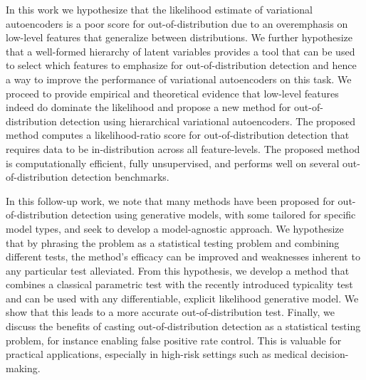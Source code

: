 In this work we hypothesize that the likelihood estimate of variational autoencoders is a poor score for out-of-distribution due to an overemphasis on low-level features that generalize between distributions. 
We further hypothesize that a well-formed hierarchy of latent variables provides a tool that can be used to select which features to emphasize for out-of-distribution detection and hence a way to improve the performance of variational autoencoders on this task. 
We proceed to provide empirical and theoretical evidence that low-level features indeed do dominate the likelihood and propose a new method for out-of-distribution detection using hierarchical variational autoencoders. 
The proposed method computes a likelihood-ratio score for out-of-distribution detection that requires data to be in-distribution across all feature-levels. 
The proposed method is computationally efficient, fully unsupervised, and performs well on several out-of-distribution detection benchmarks. 

In this follow-up work, we note that many methods have been proposed for out-of-distribution detection using generative models, with some tailored for specific model types, and seek to develop a model-agnostic approach. 
We hypothesize that by phrasing the problem as a statistical testing problem and combining different tests, the method's efficacy can be improved and weaknesses inherent to any particular test alleviated. 
From this hypothesis, we develop a method that combines a classical parametric test with the recently introduced typicality test and can be used with any differentiable, explicit likelihood generative model.
We show that this leads to a more accurate out-of-distribution test. 
Finally, we discuss the benefits of casting out-of-distribution detection as a statistical testing problem, for instance enabling false positive rate control. This is valuable for practical applications, especially in high-risk settings such as medical decision-making.


